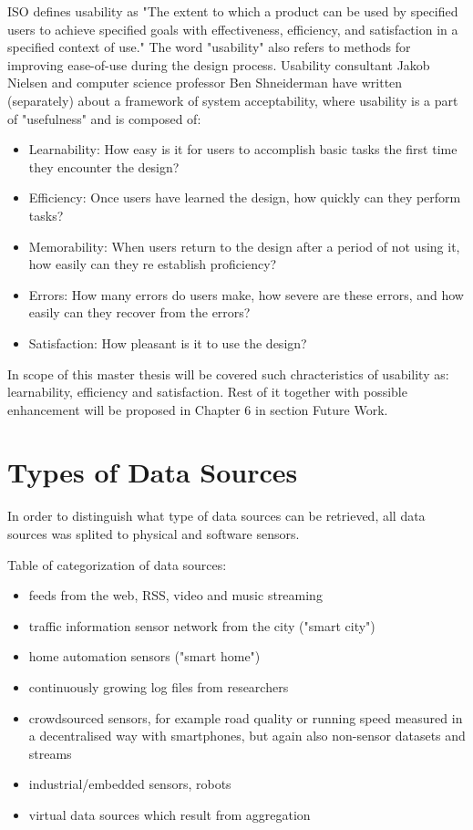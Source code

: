 	ISO defines usability as "The extent to which a product can be used by specified users to achieve specified goals with effectiveness, efficiency, and satisfaction in a specified context of use." The word "usability" also refers to methods for improving ease-of-use during the design process. Usability consultant Jakob Nielsen and computer science professor Ben Shneiderman have written (separately) about a framework of system acceptability, where usability is a part of "usefulness" and is composed of\cite{jakob}:
	\begin{itemize}
	\item Learnability: How easy is it for users to accomplish basic tasks the first time they encounter the design?
	\item Efficiency: Once users have learned the design, how quickly can they perform tasks?
	\item Memorability: When users return to the design after a period of not using it, how easily can they re establish proficiency?
	\item Errors: How many errors do users make, how severe are these errors, and how easily can they recover from the errors?
	\item Satisfaction: How pleasant is it to use the design?
	\end{itemize}

	In scope of this master thesis will be covered such chracteristics of usability as: learnability, efficiency and satisfaction. Rest of it together with possible enhancement will be proposed in Chapter 6 in section Future Work.

\section {Types of Data Sources}
    In order to distinguish what type of data sources can be retrieved, all data sources was splited to physical and software sensors.

    Table of categorization of data sources:
    \begin{itemize}
    \item feeds from the web, RSS, video and music streaming
    \item traffic information sensor network from the city ("smart city")
    \item home automation sensors ("smart home")
    \item continuously growing log files from researchers
    \item crowdsourced sensors, for example road quality or running speed measured in a decentralised way with smartphones, but again also non-sensor datasets and streams
    \item industrial/embedded sensors, robots
    \item virtual data sources which result from aggregation
    \end{itemize}

